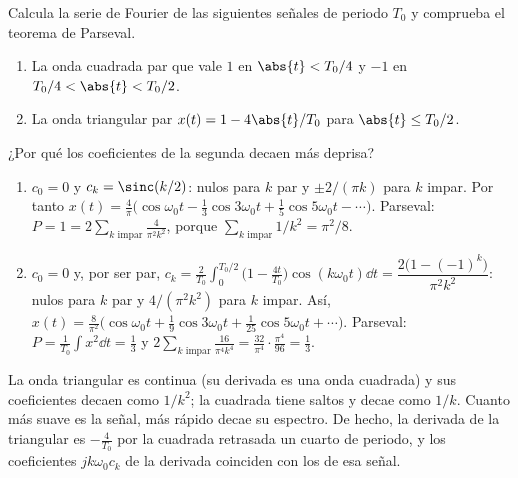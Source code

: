 \documentclass[11pt,a4paper]{scrartcl}
\begin{document}
\begin{ejercicio}
  Calcula la serie de Fourier de las siguientes señales de periodo $T_0$ y comprueba el teorema de Parseval.
  \begin{enumerate}[label=\alph*)]
    \item La onda cuadrada par que vale $1$ en $\abs{t}<T_0/4$ y $-1$ en $T_0/4<\abs{t}<T_0/2$.
    \item La onda triangular par $x(t)=1-4\abs{t}/T_0$ para $\abs{t}\le T_0/2$.
  \end{enumerate}
  ¿Por qué los coeficientes de la segunda decaen más deprisa?
\end{ejercicio}
\begin{solucion}
  \begin{enumerate}[label=\alph*)]
    \item $c_0=0$ y $c_k=\sinc(k/2)$: nulos para $k$ par y $\pm2/(\pi k)$ para $k$ impar. Por tanto $x(t)=\frac4\pi\big(\cos\omega_0t-\frac13\cos3\omega_0t+\frac15\cos5\omega_0t-\cdots\big)$. Parseval: $P=1=2\sum_{k\text{ impar}}\frac{4}{\pi^2k^2}$, porque $\sum_{k\text{ impar}}1/k^2=\pi^2/8$.
    \item $c_0=0$ y, por ser par, $c_k=\frac{2}{T_0}\int_0^{T_0/2}\big(1-\tfrac{4t}{T_0}\big)\cos(k\omega_0t)\dd t=\dfrac{2\big(1-(-1)^k\big)}{\pi^2k^2}$: nulos para $k$ par y $4/(\pi^2k^2)$ para $k$ impar. Así, $x(t)=\frac{8}{\pi^2}\big(\cos\omega_0t+\frac19\cos3\omega_0t+\frac1{25}\cos5\omega_0t+\cdots\big)$. Parseval: $P=\frac{1}{T_0}\int x^2\dd t=\frac13$ y $2\sum_{k\text{ impar}}\frac{16}{\pi^4k^4}=\frac{32}{\pi^4}\cdot\frac{\pi^4}{96}=\frac13$.
  \end{enumerate}
  La onda triangular es continua (su derivada es una onda cuadrada) y sus coeficientes decaen como $1/k^2$; la cuadrada tiene saltos y decae como $1/k$. Cuanto más suave es la señal, más rápido decae su espectro. De hecho, la derivada de la triangular es $-\frac{4}{T_0}$ por la cuadrada retrasada un cuarto de periodo, y los coeficientes $jk\omega_0c_k$ de la derivada coinciden con los de esa señal.
\end{solucion}
\end{document}
